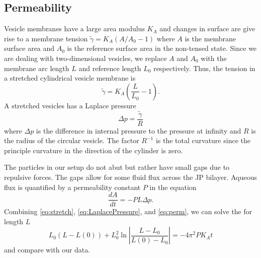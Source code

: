 \documentclass[lineno]{jfm}
\begin{document}
\subsection{Permeability}
Vesicle membranes have a large area modulus $K_A$ and changes in surface are give rise to a membrane tension
$\tilde \gamma = K_A(A/A_0 - 1)$ where $A$ is the membrane surface area and $A_0$ is the reference surface area in the non-tensed state. 
Since we are dealing with two-dimensional vesicles, we replace $A$ and $A_0$ with the membrane arc length $L$ and reference length $L_0$
respectively.  Thus, the tension in a stretched cylindrical vesicle membrane is 
\begin{equation}
\label{eq:stretch}
\tilde \gamma = K_A\left(\frac{L}{L_0} - 1 \right).
\end{equation}
A stretched vesicles has a Laplace pressure 
\begin{equation}
\label{eq:LaplacePressure}
\Delta p = \frac{\tilde \gamma}{R} 
\end{equation}
where $\Delta p$ is the difference in internal pressure to the pressure at infinity
and  $R$ is the radius of the circular vesicle.  The factor 
$R^{-1}$ is the total curvature since  the principle curvature in the direction of the cylinder is zero.

The particles in our setup do not abut but rather have small gaps due to repulsive forces.
The gaps allow for some fluid flux across the JP bilayer.  Aqueous flux is quantified by a permeability constant $P$ in the equation
\begin{equation}
\label{eq:perm}
\frac{dA}{dt} = -P  L \Delta p.
\end{equation}
Combining \eqref{eq:stretch}, \eqref{eq:LaplacePressure}, and \eqref{eq:perm}, we can solve the for length $L$ 
\begin{equation}
L_0(L-L(0)) + L_0^2 \ln\left|\frac{L-L_0}{L(0)-L_0}\right| = -4\pi^2 P K_A t
\end{equation}
and compare with our data.
\end{document}

